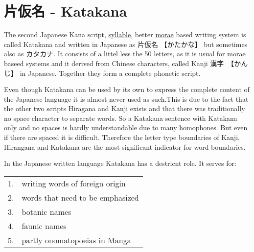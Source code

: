 \documentclass[paper=a4,headings=small,titlepage,makeidx,fontsize=12pt]{scrbook}
\begin{document}
\pagestyle{plain}
\frontmatter
\maketitle

\tableofcontents
\pagestyle{fancy}

\mainmatter

\chapter{片仮名 - Katakana}


\bigskip

The second Japanese Kana script, \hyperref[sec:Syllable]{syllable}, better
\hyperref[sec:Mora]{morae} based writing system is called Katakana and written
in Japanese as {片仮名} {【かたかな】} but sometimes also as {カタカナ}.  It
consists of a littel less the 50 letters, as it is usual for morae baseed
systems and it derived from Chinese characters, called Kanji
{漢字}　{【かんじ】} in Japanese. Together they form a complete phonetic
script. 

Even though Katakana can be used by its own to express the complete content of
the Japanese language it is almost never used as such.This is due to the fact
that the other two scripts Hiragana and Kanji exists and that there was
traditionally no space character to separate words. So a Katakana sentence with
Katakana only and no spaces is hardly understandable due to many homophones.
But even if there are spaced it is difficult. Therefore the letter type
boundaries of Kanji, Hirangana and Katakana are the most significant indicator
for word boundaries. 

In the Japanese written language Katakana has a destricnt role. It serves for:

\begin{tabular}{rl}
1.& writing words of foreign origin\\
2.& words that need to be emphasized\\
3.& botanic names\\
4.& faunic names\\
5.& partly onomatopoeias in Manga\\	
\end{tabular}
\end{document}
